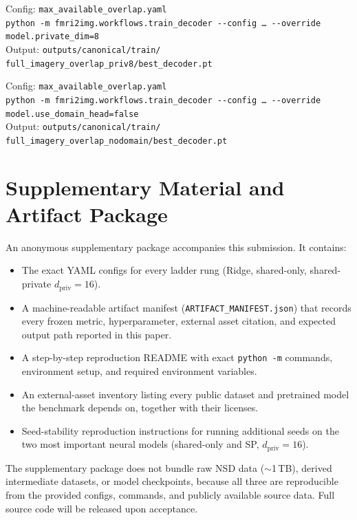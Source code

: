 \documentclass{article}
\begin{document}
\begin{description}[style=nextline,font=\normalfont\itshape,
                    leftmargin=0.5em,itemsep=6pt]
\item[Shared-private, $d_\mathrm{priv}\!=\!8$.]
  Config: \texttt{max\_available\_overlap.yaml}\\
  \texttt{python -m fmri2img.workflows.train\_decoder -{}-config \ldots{}
  -{}-override model.private\_dim=8}\\
  Output: \texttt{outputs/canonical/train/\allowbreak
  full\_imagery\_overlap\_priv8/\allowbreak best\_decoder.pt}

\item[Shared-private, no domain head (diagnostic).]
  Config: \texttt{max\_available\_overlap.yaml}\\
  \texttt{python -m fmri2img.workflows.train\_decoder -{}-config \ldots{}
  -{}-override model.use\_domain\_head=false}\\
  Output: \texttt{outputs/canonical/train/\allowbreak
  full\_imagery\_overlap\_nodomain/\allowbreak best\_decoder.pt}
\end{description}

\section{Supplementary Material and Artifact Package}
\label{app:artifacts}

An anonymous supplementary package accompanies this submission.  It contains:

\begin{itemize}[nosep,leftmargin=1.5em]
\item The exact YAML configs for every ladder rung (Ridge, shared-only,
  shared-private $d_\mathrm{priv}\!=\!16$).
\item A machine-readable artifact manifest (\texttt{ARTIFACT\_MANIFEST.json})
  that records every frozen metric, hyperparameter, external asset citation,
  and expected output path reported in this paper.
\item A step-by-step reproduction README with exact \texttt{python -m} commands,
  environment setup, and required environment variables.
\item An external-asset inventory listing every public dataset and pretrained
  model the benchmark depends on, together with their licenses.
\item Seed-stability reproduction instructions for running additional seeds on
  the two most important neural models (shared-only and SP,
  $d_\mathrm{priv}\!=\!16$).
\end{itemize}

\noindent
The supplementary package does not bundle raw NSD data ($\sim$1\,TB), derived
intermediate datasets, or model checkpoints, because all three are reproducible
from the provided configs, commands, and publicly available source data.  Full
source code will be released upon acceptance.
\end{document}
